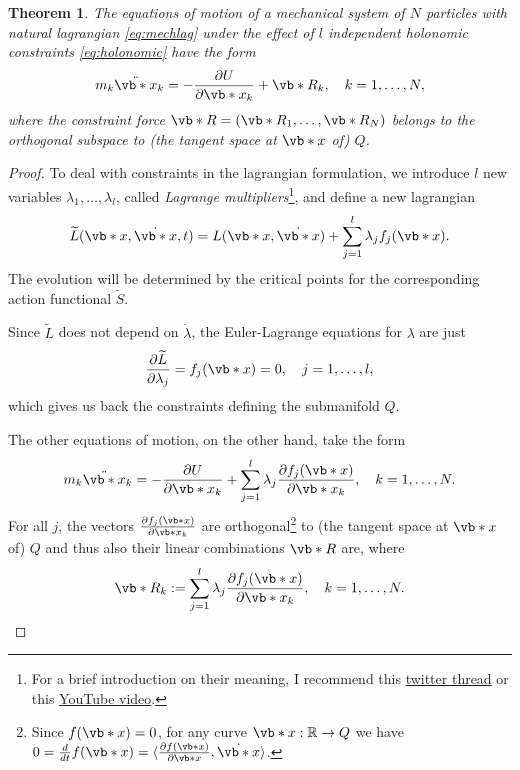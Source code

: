 \documentclass[english,fontsize=11pt,paper=b5]{scrbook}
\numberwithin{equation}{chapter}
\newtheorem{theorem}{Theorem}[chapter]
\theoremstyle{definition}
\begin{document}
    \begin{theorem}
      The equations of motion of a mechanical system of $N$ particles with natural lagrangian \eqref{eq:mechlag} under the effect of $l$ independent holonomic constraints \eqref{eq:holonomic} have the form
      \begin{equation}\label{eq:generalnewtonconstraint}
        m_k \ddot{\vb*{x}}_k = - \frac{\partial U}{\partial \vb*{x}_k} + \vb*{R}_k, \quad k=1, \ldots, N,
      \end{equation}
      where the \emph{constraint force} $\vb*{R} = (\vb*{R}_1, \ldots, \vb*{R}_N)$ belongs to the orthogonal subspace to (the tangent space at $\vb*{x}$ of) $Q$.
    \end{theorem}
    \begin{proof}
      To deal with constraints in the lagrangian formulation, we introduce $l$ new variables $\lambda_1, \ldots, \lambda_l$, called \emph{Lagrange multipliers}\footnote{For a brief introduction on their meaning, I recommend this \href{https://twitter.com/j\_bertolotti/status/1569324058633801729}{twitter thread} or this \href{https://www.youtube.com/watch?v=5A39Ht9Wcu0}{YouTube video}.}, and define a new lagrangian
      \begin{equation}
        \widetilde L(\vb*{x}, \dot{\vb*{x}}, t) = L(\vb*{x}, \dot{\vb*{x}}) + \sum_{j=1}^l \lambda_j f_j(\vb*{x}).
      \end{equation}
      The evolution will be determined by the critical points for the corresponding action functional $\widetilde S$.

      Since $\widetilde L$ does not depend on $\dot\lambda$, the Euler-Lagrange equations for $\lambda$ are just
      \begin{equation}
        \frac{\partial \widetilde L}{\partial \lambda_j} = f_j(\vb*{x}) = 0,\quad j=1,\ldots,l,
      \end{equation}
      which gives us back the constraints defining the submanifold $Q$.

      The other equations of motion, on the other hand, take the form
      \begin{equation}\label{eq:newtconstr}
        m_k \ddot{\vb*{x}}_k = -\frac{\partial U}{\partial\vb*{x}_k} + \sum_{j=1}^l \lambda_j \frac{\partial f_j(\vb*{x})}{\partial \vb*{x}_k},
        \quad k=1,\ldots,N.
      \end{equation}
      For all $j$, the vectors $\frac{\partial f_j(\vb*{x})}{\partial \vb*{x}_k}$ are orthogonal\footnote{Since $f(\vb*{x}) = 0$, for any curve $\vb*{x}:\mathbb{R}\to Q$ we have $0 = \frac{d}{dt} f(\vb*{x}) = \langle \frac{\partial f(\vb*{x})}{\partial \vb*{x}}, \dot{\vb*{x}} \rangle$.} to (the tangent space at $\vb*{x}$ of) $Q$ and thus also their linear combinations $\vb*{R}$ are, where
      \begin{equation}
        \vb*{R}_k := \sum_{j=1}^l \lambda_j \frac{\partial f_j(\vb*{x})}{\partial \vb*{x}_k},
        \quad k=1,\ldots,N.
      \end{equation}
    \end{proof}
\end{document}
